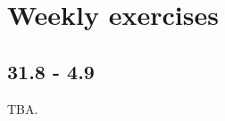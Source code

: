\documentclass{article}
\begin{document}

\chapter{Weekly exercises}

\section{31.8 - 4.9}

TBA.
\end{document}
